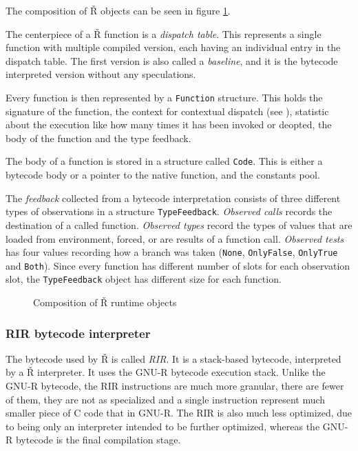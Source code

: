 The composition of Ř objects can be seen in figure \ref{fig:rsh-composition}.

The centerpiece of a Ř function is a \textit{dispatch table}. This represents a single function with multiple compiled version, each having an individual entry in the dispatch table. The first version is also called a \textit{baseline}, and it is the bytecode interpreted version without any speculations.

Every function is then represented by a \texttt{Function} structure. This holds the signature of the function, the context for contextual dispatch (see ), statistic about the execution like how many times it has been invoked or deopted, the body of the function and the type feedback.

The body of a function is stored in a structure called \texttt{Code}. This is either a bytecode body or a pointer to the native function, and the constants pool.

The \textit{feedback} collected from a bytecode interpretation consists of three different types of observations in a structure \texttt{TypeFeedback}. \textit{Observed calls} records the destination of  a called function. \textit{Observed types} record the types of values that are loaded from environment, forced, or are results of a function call. \textit{Observed tests} has four values recording how a branch was taken (\texttt{None}, \texttt{OnlyFalse}, \texttt{OnlyTrue} and \texttt{Both}). Since every function has different number of slots for each observation slot, the \texttt{TypeFeedback} object has different size for each function. 

\begin{figure}
	\centering
	\caption{Composition of Ř runtime objects}\label{fig:rsh-composition}
\end{figure}


\subsubsection*{RIR bytecode interpreter}

The bytecode used by Ř is called \textit{RIR}. It is a stack-based bytecode, interpreted by a Ř interpreter. It uses the GNU-R bytecode execution stack. Unlike the GNU-R bytecode, the RIR instructions are much more granular, there are fewer of them, they are not as specialized and a single instruction represent much smaller piece of C code that in GNU-R. The RIR is also much less optimized, due to being only an interpreter intended to be further optimized, whereas the GNU-R bytecode is the final compilation stage.

